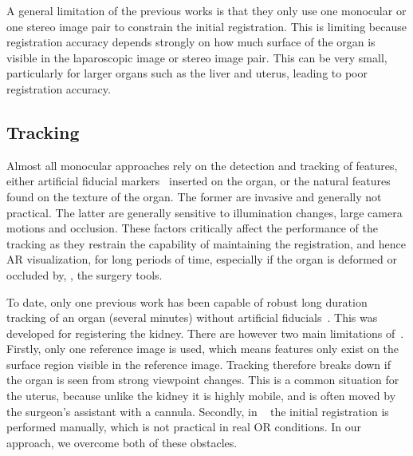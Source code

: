 A general limitation of the previous works is that they only use one monocular or one stereo image pair to constrain the initial registration.
This is limiting because registration accuracy depends strongly on how much surface of the organ is visible in the laparoscopic image or stereo image pair. 
This can be very small, particularly for larger organs such as the liver and uterus, leading to poor registration accuracy.



\subsection{Tracking}
\label{sec:sotaTracking}
Almost all monocular approaches rely on the detection and tracking of features, either artificial fiducial markers~\cite{Cohen2010Prostate} inserted on the organ, or the natural features found on the texture of the organ. The former are invasive and generally not practical. The latter are generally sensitive to illumination changes, large camera motions and occlusion. These factors critically affect the performance of the tracking as they restrain the capability of maintaining the registration, and hence AR visualization, for long periods of time, especially if the organ is deformed or occluded by, \eg, the surgery tools. 

To date, only one previous work has been capable of robust long duration tracking of an organ (several minutes) without artificial fiducials~\cite{affineTracking}. 
This was developed for registering the kidney. %
There are however two main limitations of~\cite{affineTracking}. 
Firstly, only one reference image is used, which means features only exist on the surface region visible in the reference image. 
Tracking therefore breaks down if the organ is seen from strong viewpoint changes. This is a common situation for the uterus, because unlike the kidney it is highly mobile, and is often moved by the surgeon's assistant with a cannula. 
Secondly, in ~\cite{affineTracking} the initial registration is performed manually, which is not practical in real OR conditions. 
In our approach, we overcome both of these obstacles. 

